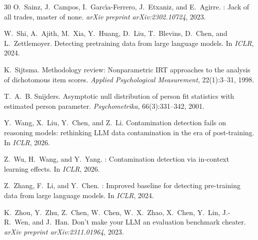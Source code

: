 \documentclass[11pt,twocolumn]{article}
\begin{document}
\begin{thebibliography}{30}
O.~Sainz, J.~Campos, I.~Garc{\'\i}a-Ferrero, J.~Etxaniz, and E.~Agirre.
: Jack of all trades, master of none.
\newblock \emph{arXiv preprint arXiv:2302.10724}, 2023.

W.~Shi, A.~Ajith, M.~Xia, Y.~Huang, D.~Liu, T.~Blevins, D.~Chen, and L.~Zettlemoyer.
\newblock Detecting pretraining data from large language models.
\newblock In \emph{ICLR}, 2024.

K.~Sijtsma.
\newblock Methodology review: Nonparametric {IRT} approaches to the analysis of dichotomous item scores.
\newblock \emph{Applied Psychological Measurement}, 22(1):3--31, 1998.

T.~A.~B. Snijders.
\newblock Asymptotic null distribution of person fit statistics with estimated person parameter.
\newblock \emph{Psychometrika}, 66(3):331--342, 2001.

Y.~Wang, X.~Liu, Y.~Chen, and Z.~Li.
\newblock Contamination detection fails on reasoning models: rethinking {LLM} data contamination in the era of post-training.
\newblock In \emph{ICLR}, 2026.

Z.~Wu, H.~Wang, and Y.~Yang.
: Contamination detection via in-context learning effects.
\newblock In \emph{ICLR}, 2026.

Z.~Zhang, F.~Li, and Y.~Chen.
: Improved baseline for detecting pre-training data from large language models.
\newblock In \emph{ICLR}, 2024.

K.~Zhou, Y.~Zhu, Z.~Chen, W.~Chen, W.~X.~Zhao, X.~Chen, Y.~Lin, J.-R.~Wen, and J.~Han.
\newblock Don't make your {LLM} an evaluation benchmark cheater.
\newblock \emph{arXiv preprint arXiv:2311.01964}, 2023.

\end{thebibliography}
\end{document}
